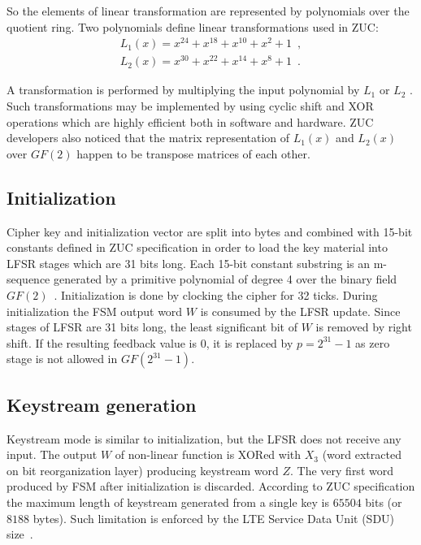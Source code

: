 So the elements of linear transformation are represented by polynomials over
the quotient ring. Two polynomials define linear transformations used in ZUC: 
\begin{equation}
    \begin{array}{ll}
        L_1(x) = x^{24} + x^{18} + x^{10} + x^{2} + 1 \enspace, \\
        L_2(x) = x^{30} + x^{22} + x^{14} + x^{8} + 1 \enspace.
    \end{array}
\end{equation}

A transformation is performed by multiplying the input polynomial by $L_1$ or
$L_2$ . Such
transformations may be implemented by using cyclic shift and XOR operations
which are highly efficient both in software and hardware. ZUC developers also
noticed that the matrix representation of $L_1(x)$ and $L_2(x)$ over $GF(2)$
happen to be transpose matrices of each other.

\subsection{Initialization}
\label{sec:zuc-init}

Cipher key and initialization vector are split into bytes and combined with
15-bit constants defined in ZUC specification in order to load the key material
into LFSR stages which are 31 bits long. Each 15-bit constant substring is an
m-sequence generated by a primitive polynomial of degree 4 over the binary
field $GF(2)$~\cite{zuc:forum}. Initialization is done by clocking the cipher for 32 ticks. During
initialization the FSM output word $W$ is consumed by the LFSR update. Since
stages of LFSR are 31 bits long, the least significant bit of $W$ is removed by
right shift. If the resulting feedback value is 0, it is replaced by 
$p = 2^{31} - 1$ as zero stage is not allowed in $GF(2^{31}-1)$. 

\subsection{Keystream generation}
\label{sec:zuc-key-gen}

Keystream mode is similar to initialization, but the LFSR does not receive any
input. The output $W$ of non-linear function is XORed with $X_3$ (word extracted
on bit reorganization layer) producing keystream word $Z$. The very first word
produced by FSM after initialization is discarded. According to ZUC
specification the maximum length of keystream generated from a single key is
$65504$ bits (or $8188$ bytes). Such limitation is enforced by the LTE Service Data
Unit (SDU) size~\cite{zuc:dacas-page}.

